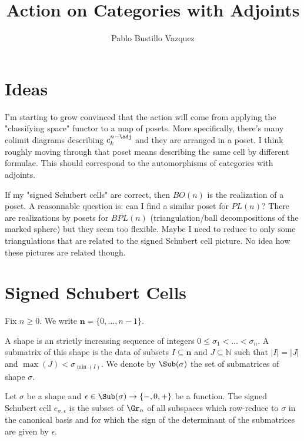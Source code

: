 \documentclass{article}
\title{Action on Categories with Adjoints}
\author{Pablo Bustillo Vazquez}
\begin{document}
\maketitle
\tableofcontents
\newpage

\section{Ideas}

I'm starting to grow convinced that the action will come from applying the "classifying space" functor to a map of posets.
More specifically, there's many colimit diagrams describing $c_k^{n-\adj}$ and they are arranged in a poset.
I think roughly moving through that poset means describing the same cell by different formulae.
This should correspond to the automorphisms of categories with adjoints.

If my "signed Schubert cells" are correct, then $BO(n)$ is the realization of a poset.
A reasonnable question is: can I find a similar poset for $PL(n)$?
There are realizations by posets for $BPL(n)$ (triangulation/ball decompositions of the marked sphere) but they seem too flexible.
Maybe I need to reduce to only some triangulations that are related to the signed Schubert cell picture.
No idea how these pictures are related though.

\section{Signed Schubert Cells}

Fix $n \geq 0$. We write $\mathbf{n} = \{0, \ldots, n-1\}$.

\begin{definition}
    A shape is an strictly increasing sequence of integers $0 \leq \sigma_1 < \ldots < \sigma_n$.
    A submatrix of this shape is the data of subsets $I \subseteq \mathbf{n}$ and $J \subseteq \mathbb{N}$ such that $|I| = |J|$ and $\max(J) < \sigma_{\min(I)}$.
    We denote by $\Sub(\sigma)$ the set of submatrices of shape $\sigma$.
\end{definition}

\begin{definition}[Cell]
    Let $\sigma$ be a shape and $\epsilon\in \Sub(\sigma) \to \{-, 0, +\}$ be a function.
    The signed Schubert cell $e_{\sigma, \epsilon}$ is the subset of $\Gr_n$ of all subspaces which row-reduce to $\sigma$ in the canonical basis and for which the sign of the determinant of the submatrices are given by $\epsilon$.
\end{definition}
\end{document}
